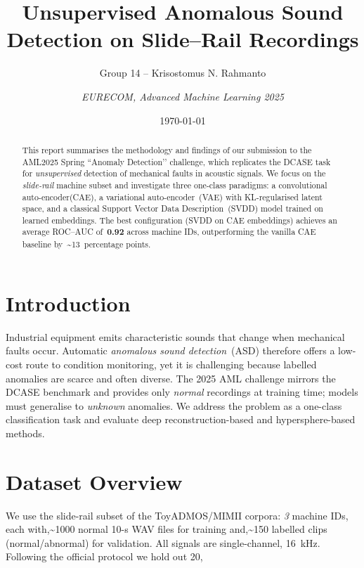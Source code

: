 \documentclass[11pt,a4paper]{article}
\title{Unsupervised Anomalous Sound Detection on Slide–Rail Recordings}
\author{Group 14 – Krisostomus N. Rahmanto \and \textit{EURECOM, Advanced Machine Learning 2025}}
\date{\today}
\begin{document}
\maketitle

\begin{abstract}
This report summarises the methodology and findings of our submission to the AML2025 Spring ``Anomaly Detection’’ challenge, which replicates the DCASE task for \emph{unsupervised} detection of mechanical faults in acoustic signals.  We focus on the \emph{slide-rail} machine subset and investigate three one-class paradigms: a convolutional auto-encoder(CAE), a variational auto-encoder~(VAE) with KL-regularised latent space, and a classical Support Vector Data Description~(SVDD) model trained on learned embeddings.  The best configuration (SVDD on CAE embeddings) achieves an average ROC–AUC of~\textbf{0.92} across machine IDs, outperforming the vanilla CAE baseline by~\textasciitilde13~percentage points.
\end{abstract}

\section{Introduction}
Industrial equipment emits characteristic sounds that change when mechanical faults occur.  Automatic \emph{anomalous sound detection}~(ASD) therefore offers a low-cost route to condition monitoring, yet it is challenging because labelled anomalies are scarce and often diverse.  The 2025 AML challenge mirrors the DCASE benchmark and provides only \textit{normal} recordings at training time; models must generalise to \emph{unknown} anomalies.
We address the problem as a one-class classification task and evaluate deep reconstruction-based and hypersphere-based methods.

\section{Dataset Overview}
We use the slide-rail subset of the ToyADMOS/MIMII corpora: \emph{3} machine IDs, each with,\textasciitilde1000 normal 10-s WAV files for training and,\textasciitilde150 labelled clips (normal/abnormal) for validation.  All signals are single-channel, 16~kHz.  Following the official protocol we hold out 20,%
\end{document}
